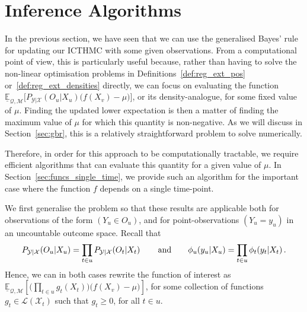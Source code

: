 \documentclass[twoside,11pt]{article}
\newcommand{\states}{\mathcal{X}}
\newcommand{\observs}{\mathcal{Y}}
\newcommand{\lexp}{\underline{\mathbb{E}}_{\rateset,\mathcal{M}}}
\newcommand{\gambles}{\mathcal{L}}
\newcommand{\rateset}{\mathcal{Q}}
\begin{document}
\section{Inference Algorithms}\label{sec:inference_algos}

In the previous section, we have seen that we can use the generalised Bayes' rule for updating our ICTHMC with some given observations. From a computational point of view, this is particularly useful because, rather than having to solve the non-linear optimisation problems %
in Definitions~\ref{def:reg_ext_pos} or~\ref{def:reg_ext_densities} directly, 
we can focus on evaluating the function $\lexp\bigl[P_{\observs\vert\states}(O_u\vert X_u)\bigl(f(X_v) - \mu\bigr)\bigr]$,
or its density-analogue, for some fixed value of $\mu$. Finding the updated lower expectation is then a matter of finding the maximum value of $\mu$ for which this quantity is non-negative. As we will discuss in Section~\ref{sec:gbr}, this is a relatively straightforward problem to solve numerically.

Therefore, in order for this approach to be computationally tractable, we require efficient algorithms that can evaluate this quantity for a given value of $\mu$. In Section~\ref{sec:funcs_single_time}, we provide such an algorithm for the important case where the function $f$ depends on a single time-point.

We first generalise the problem so that these results are applicable both for observations of the form $(Y_u\in O_u)$, and for point-observations $(Y_u=y_u)$ in an uncountable outcome space. Recall that%
\begin{equation*}
P_{\observs\vert\states}(O_u\vert X_u) = \prod_{t\in u}P_{\observs\vert\states}(O_{t}\vert X_{t})\,\quad\quad\text{and}\quad\quad \phi_u(y_u\vert X_u) = \prod_{t\in u}\phi_{t}(y_{t}\vert X_{t})\,.\vspace{-5pt}
\end{equation*}
Hence, we can in both cases rewrite the function of interest as
$\lexp\left[ \bigl(\prod_{t\in u}g_{t}(X_{t})\bigr)\bigl(f(X_v) - \mu\bigr) \right]$,
for some collection of functions $g_{t}\in\gambles(\states_{t})$ such that $g_{t}\geq 0$, for all $t\in u$.
\end{document}
